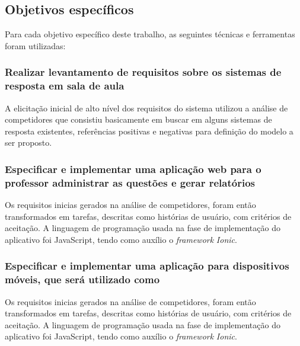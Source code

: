 %

\subsection{Objetivos específicos}

Para cada objetivo específico deste trabalho, as seguintes técnicas e ferramentas foram utilizadas:

\subsubsection{Realizar levantamento de requisitos sobre os sistemas de resposta em sala de aula}

A elicitação inicial de alto nível dos requisitos do sistema utilizou a análise de competidores que
consistiu basicamente em buscar em alguns sistemas de resposta existentes, referências positivas e
negativas para definição do modelo a ser proposto.

\subsubsection{Especificar e implementar uma aplicação web para o professor administrar as questões e gerar relatórios}
Os requisitos inicias gerados na análise de competidores, foram então transformados em tarefas, descritas
como histórias de usuário, com critérios de aceitação. A linguagem de programação usada na fase de implementação do aplicativo foi JavaScript, tendo como auxílio o \textit{framework} \textit{Ionic}.

\subsubsection{Especificar e implementar uma aplicação para dispositivos móveis, que será utilizado como {\clickers}}
Os requisitos inicias gerados na análise de competidores, foram então transformados em tarefas, descritas
como histórias de usuário, com critérios de aceitação. A linguagem de programação usada na fase de implementação do aplicativo foi JavaScript, tendo como auxílio o \textit{framework} \textit{Ionic}.

